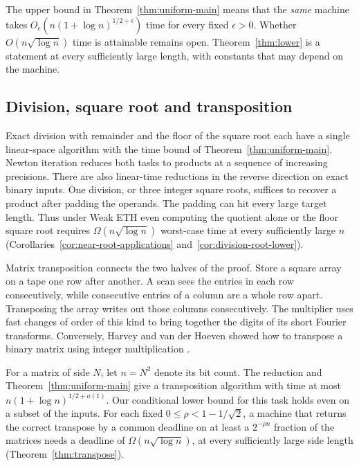 The upper bound in Theorem~\ref{thm:uniform-main} means that the
\emph{same} machine takes $O_\epsilon(n(1+\log n)^{1/2+\epsilon})$
time for every fixed $\epsilon>0$. Whether $O(n\sqrt{\log n})$ time
is attainable remains open. Theorem~\ref{thm:lower} is a statement
at every sufficiently large length, with constants that may depend
on the machine.

\subsection{Division, square root and transposition}

Exact division with remainder and the floor of the square root each
have a single linear-space algorithm with the time bound of
Theorem~\ref{thm:uniform-main}. Newton iteration reduces both tasks
to products at a sequence of increasing precisions. There are also
linear-time reductions in the reverse direction on exact binary inputs.
One division, or three integer square roots, suffices to recover a
product after padding the operands. The padding can hit every large
target length. Thus under Weak ETH even computing the quotient alone
or the floor square root requires $\Omega(n\sqrt{\log n})$ worst-case
time at every sufficiently large $n$ (Corollaries~\ref{cor:near-root-applications}
and~\ref{cor:division-root-lower}).

Matrix transposition connects the two halves of the proof. Store a
square array on a tape one row after another. A scan sees the entries
in each row consecutively, while consecutive entries of a column are
a whole row apart. Transposing the array writes out those columns
consecutively. The multiplier uses fast changes of order of this kind
to bring together the digits of its short Fourier transforms.
Conversely, Harvey and van der Hoeven showed how to transpose a
binary matrix using integer multiplication \cite{hvhtranspose}.

For a matrix of side $N$, let $n=N^2$ denote its bit count. The
reduction and Theorem~\ref{thm:uniform-main} give a transposition
algorithm with time at most $n(1+\log n)^{1/2+o(1)}$. Our conditional
lower bound for this task holds even on a subset of the inputs. For
each fixed $0\le\rho<1-1/\sqrt2$, a machine that returns the correct
transpose by a common deadline on at least a $2^{-\rho n}$ fraction of
the matrices needs a deadline of $\Omega(n\sqrt{\log n})$, at every
sufficiently large side length (Theorem~\ref{thm:transpose}).



